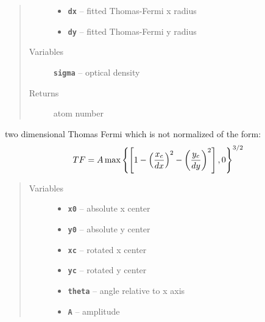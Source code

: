 \documentclass[letterpaper,10pt,english]{sphinxmanual}
\begin{document}
\begin{fulllineitems}
\begin{fulllineitems}
\begin{quote}
\begin{description}
\begin{itemize}
\item {} 
\textbf{\texttt{dx}} -- fitted Thomas-Fermi x radius

\item {} 
\textbf{\texttt{dy}} -- fitted Thomas-Fermi y radius

\end{itemize}

\item[{Variables}] \leavevmode
\textbf{\texttt{sigma}} -- optical density

\item[{Returns}] \leavevmode
atom number

\end{description}\end{quote}

\end{fulllineitems}


\begin{fulllineitems}
\label{fit_object:Fitobject.fit_object.TF_2D}
two dimensional Thomas Fermi which is not normalized of the form:
\begin{gather}
\begin{split}TF = A \max\left\{\left[1-\left(\frac{x_c}{dx}\right)^2-\left(\frac{y_c}{dy}\right)^2\right],0\right\}^{3/2}\end{split}\notag
\end{gather}\begin{quote}\begin{description}
\item[{Variables}] \leavevmode\begin{itemize}
\item {} 
\textbf{\texttt{x0}} -- absolute x center

\item {} 
\textbf{\texttt{y0}} -- absolute y center

\item {} 
\textbf{\texttt{xc}} -- rotated x center

\item {} 
\textbf{\texttt{yc}} -- rotated y center

\item {} 
\textbf{\texttt{theta}} -- angle relative to x axis

\item {} 
\textbf{\texttt{A}} -- amplitude


\end{itemize}
\end{description}
\end{quote}
\end{fulllineitems}
\end{fulllineitems}
\end{document}
